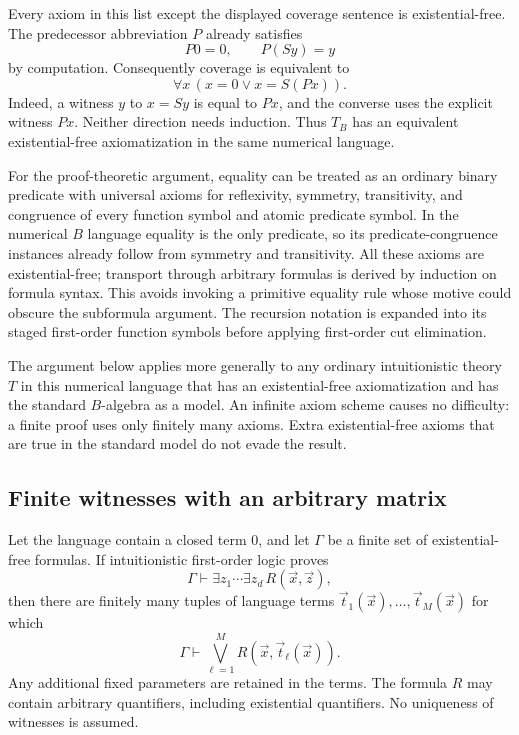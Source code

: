 Every axiom in this list except the displayed coverage sentence is
existential-free. The predecessor abbreviation $P$ already satisfies
\[
                         P0=0,\qquad P(Sy)=y
\]
by computation. Consequently coverage is equivalent to
\[
                      \forall x\,(x=0\vee x=S(Px)).
                      \tag{Coverage$'$}\label{rel:coverage-prime}
\]
Indeed, a witness $y$ to $x=Sy$ is equal to $Px$, and the converse uses
the explicit witness $Px$. Neither direction needs induction. Thus
$T_B$ has an equivalent existential-free axiomatization in the same
numerical language.

For the proof-theoretic argument, equality can be treated as an ordinary
binary predicate with universal axioms for reflexivity, symmetry,
transitivity, and congruence of every function symbol and atomic predicate
symbol. In the numerical $B$ language equality is the only predicate, so
its predicate-congruence instances already follow from symmetry and
transitivity. All these axioms
are existential-free; transport through arbitrary formulas is derived
by induction on formula syntax. This avoids invoking a primitive
equality rule whose motive could obscure the subformula argument.
The recursion notation is expanded into its staged first-order function
symbols before applying first-order cut elimination.

The argument below applies more generally to any ordinary intuitionistic
theory $T$ in this numerical language that has an existential-free
axiomatization and has the standard $B$-algebra as a model. An infinite
axiom scheme causes no difficulty: a finite proof uses only finitely
many axioms. Extra existential-free axioms that are true in the standard
model do not evade the result.

\subsection{Finite witnesses with an arbitrary matrix}

\begin{lemma}
\label{rel:finite-witnesses}
Let the language contain a closed term $0$, and let $\Gamma$ be a finite
set of existential-free formulas. If intuitionistic first-order logic
proves
\[
                      \Gamma\vdash\exists z_1\cdots\exists z_d\,
                                      R(\vec x,\vec z),
\]
then there are finitely many tuples of language terms
$\vec t_1(\vec x),\ldots,\vec t_M(\vec x)$ for which
\[
                   \Gamma\vdash
                   \bigvee_{\ell=1}^{M}R(\vec x,\vec t_\ell(\vec x)).
                   \tag{Witness list}\label{rel:witness-list}
\]
Any additional fixed parameters are retained in the terms. The formula
$R$ may contain arbitrary quantifiers, including existential quantifiers.
No uniqueness of witnesses is assumed.
\end{lemma}

